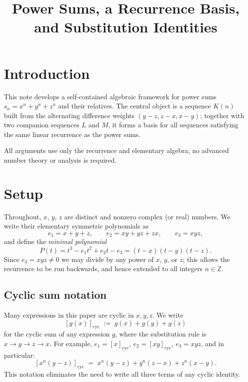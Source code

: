 \documentclass[12pt]{article}
\title{Power Sums, a Recurrence Basis, and Substitution Identities}
\author{}
\date{}
\theoremstyle{definition}
\newcommand{\cyc}[1]{\left[#1\right]_{\!\mathrm{cyc}}}
\begin{document}
	\maketitle
	\tableofcontents
	\newpage
	
	\section*{Introduction}
	
	This note develops a self-contained algebraic framework for power sums
	$s_n = x^n + y^n + z^n$ and their relatives.  The central object is a
	sequence $K(n)$ built from the alternating difference weights $(y-z, z-x, x-y)$; together
	with two companion sequences $L$ and $M$, it forms a basis for all sequences
	satisfying the same linear recurrence as the power sums.
	
	All arguments use only the recurrence and elementary algebra; no
	advanced number theory or analysis is required.
	
	\section{Setup}
	
	Throughout, $x$, $y$, $z$ are distinct and nonzero complex (or real)
	numbers.  We write their elementary symmetric polynomials as
	\[
	e_1 = x+y+z, \qquad e_2 = xy+yz+zx, \qquad e_3 = xyz,
	\]
	and define the \emph{minimal polynomial}
	\[
	P(t) = t^3 - e_1 t^2 + e_2 t - e_3 = (t-x)(t-y)(t-z).
	\]
	Since $e_3 = xyz \neq 0$ we may divide by any power of $x$, $y$, or $z$;
	this allows the recurrence to be run backwards, and hence extended to all integers $n \in \mathbb{Z}$.
	
	\subsection{Cyclic sum notation}
	
	Many expressions in this paper are cyclic in $x, y, z$.  We write
	\[
	\cyc{g(x)} \;:=\; g(x) + g(y) + g(z)
	\]
	for the cyclic sum of any expression $g$, where the substitution rule is $x \to y \to z \to x$.  For example,
	$e_1 = \cyc{x}$, $e_2 = \cyc{xy}$, $e_3 = xyz$, and in particular:
	\[
	\cyc{x^n(y-z)} \;=\; x^n(y-z) + y^n(z-x) + z^n(x-y).
	\]
	This notation eliminates the need to write all three terms of any
	cyclic identity.
	
\end{document}
